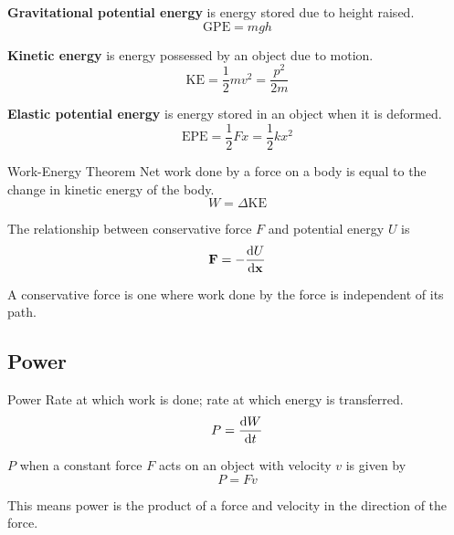 \textbf{Gravitational potential energy} is energy stored due to height raised.
\begin{equation}
\mathrm{GPE} = mgh
\end{equation}


\textbf{Kinetic energy} is energy possessed by an object due to motion.
\begin{equation} 
\mathrm{KE} = \frac{1}{2}mv^2 = \frac{p^2}{2m} 
\end{equation}


\textbf{Elastic potential energy} is energy stored in an object when it is deformed.
\begin{equation}
\mathrm{EPE} = \frac{1}{2} Fx = \frac{1}{2} k x^2 
\end{equation}

\begin{defn}{Work-Energy Theorem}{}
Net work done by a force on a body is equal to the change in kinetic energy of the body.
\begin{equation} W = \Delta \mathrm{KE} \end{equation}
\end{defn} 

The relationship between conservative force $F$ and potential energy $U$ is
\begin{equation}
\vb{F}=-\dv{U}{\vb{x}}
\end{equation}
\begin{remark}
A conservative force is one where work done by the force is independent of its path.
\end{remark}
\pagebreak

\subsection{Power}
\begin{defn}{Power}{}
Rate at which work is done; rate at which energy is transferred.
\begin{equation}
P = \dv{W}{t}
\end{equation}
\end{defn}

 $P$ when a constant force $F$ acts on an object with velocity $v$ is given by
\begin{equation} P = Fv \end{equation}
\begin{remark}
This means power is the product of a force and velocity in the direction of the force.
\end{remark}

